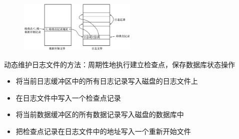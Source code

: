 \begin{figure}[H]
    \vspace{-0.5em}
	\centering
	\includegraphics[width=0.5\textwidth]{images/10.5.4.1}
    \vspace{-1em}
\end{figure}

动态维护日志文件的方法：周期性地执行建立检查点，保存数据库状态操作
\begin{itemize}
    \item 将当前日志缓冲区中的所有日志记录写入磁盘的日志文件上
    \item 在日志文件中写入一个检查点记录
    \item 将当前数据缓冲区的所有数据记录写入磁盘的数据库中
    \item 把检查点记录在日志文件中的地址写入一个重新开始文件
\end{itemize}

